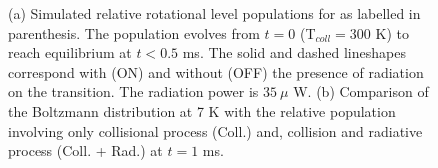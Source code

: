 \begin{figure}[!htb]
    \hfill
    
    \caption{(a) Simulated relative rotational level populations for \CD as labelled in parenthesis. The population evolves from $t=0$ (T$_{coll}=300$ K) to reach equilibrium at $t<0.5$ ms. The solid and dashed lineshapes correspond with (ON) and without (OFF) the presence of radiation on the \CD \CDline transition. The radiation power is $35\ \mu$ W. (b) Comparison of the Boltzmann distribution at 7 K with the relative population involving only collisional process (Coll.) and, collision and radiative process (Coll. + Rad.) at $t=1$ ms.}
    \label{fig:ROSAA-sim-coll-rad-population-boltzmann}
\end{figure}
